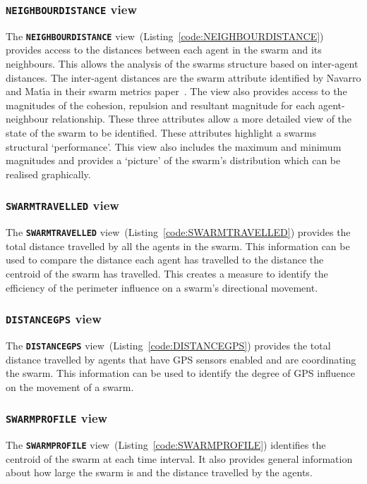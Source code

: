 \subsubsection{\texttt{\textbf{NEIGHBOURDISTANCE}} view}
The \texttt{\textbf{NEIGHBOURDISTANCE}} view~(Listing~\ref{code:NEIGHBOURDISTANCE}) provides access to the distances between each agent in the swarm and its neighbours. This allows the analysis of the swarms structure based on inter-agent distances. The inter-agent distances are the swarm attribute identified by Navarro and Mat{\'\i}a in their swarm metrics paper~\cite{NIM:09}. The view also provides access to the magnitudes of the cohesion, repulsion and resultant magnitude for each agent-neighbour relationship. These three attributes allow a more detailed view of the state of the swarm to be identified. These attributes highlight a swarms structural `performance'. This view also includes the maximum and minimum magnitudes and provides a `picture' of the swarm's distribution which can be realised graphically.

\subsubsection{\texttt{\textbf{SWARMTRAVELLED}} view}
The \texttt{\textbf{SWARMTRAVELLED}} view~(Listing~\ref{code:SWARMTRAVELLED}) provides the total distance travelled by all the agents in the swarm. This information can be used to compare the distance each agent has travelled to the distance the centroid of the swarm has travelled. This creates a measure to identify the efficiency of the perimeter influence on a swarm's directional movement.

\subsubsection{\texttt{\textbf{DISTANCEGPS}} view}
The \texttt{\textbf{DISTANCEGPS}} view~(Listing~\ref{code:DISTANCEGPS}) provides the total distance travelled by agents that have GPS sensors enabled and are coordinating the swarm. This information can be used to identify the degree of GPS influence on the movement of a swarm. 

\subsubsection{\texttt{\textbf{SWARMPROFILE}} view}
The \texttt{\textbf{SWARMPROFILE}} view~(Listing~\ref{code:SWARMPROFILE}) identifies the centroid of the swarm at each time interval. It also provides general information about how large the swarm is and the distance travelled by the agents.

